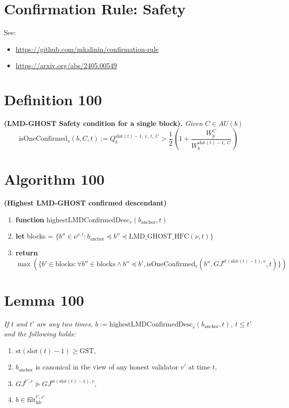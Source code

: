 \documentclass{article}
\begin{document}
\section*{Confirmation Rule: Safety}

See:
\begin{itemize}
    \item \href{https://github.com/mkalinin/confirmation-rule}{https://github.com/mkalinin/confirmation-rule}
    \item \href{https://arxiv.org/abs/2405.00549}{https://arxiv.org/abs/2405.00549}
\end{itemize}

\section*{Definition 100}
\textbf{(LMD-GHOST Safety condition for a single block).} \textit{Given $C \in AU(b)$}
\[
\text{isOneConfirmed}_v(b, C, t) := Q^{\text{slot}(t)-1,\ v,\ t,\ C}_{b} > \frac{1}{2}\left(1 + \frac{W^C_p}{W^{\text{slot}(t)-1,\ C}_b}\right)
\]

\section*{Algorithm 100}
\textbf{(Highest LMD-GHOST confirmed descendant)}

\begin{enumerate}
    \item \textbf{function} highestLMDConfirmedDesc$_v(b_{\text{anchor}}, t)$
    \item \quad \textbf{let} blocks = $\{b'' \in \nu^{v,t} : b_{\text{anchor}} \preceq b'' \preceq \text{LMD\_GHOST\_HFC}(\nu, t)\}$
    \item \quad \textbf{return} $\max(\{b' \in \text{blocks} : \forall b'' \in \text{blocks} \wedge b'' \preceq b', \text{isOneConfirmed}_v(b'', GJ^{\text{st}(\text{slot}(t) - 1),v}, t)\})$
\end{enumerate}

\section*{Lemma 100}
\textit{If $t$ and $t'$ are any two times, $b := \text{highestLMDConfirmedDesc}_v(b_{\text{anchor}}, t)$, $t \leq t'$ and the following holds:}
\begin{enumerate}
    \item $\text{st}(\text{slot}(t) - 1) \geq \text{GST},$
    \item $b_{\text{anchor}}$ is canonical in the view of any honest validator $v'$ at time $t,$
    \item $GJ^{t',v} \succeq GJ^{\text{st}(\text{slot}(t) - 1),v},$
    \item $b \in \text{filt}^{t',v'}_{\text{hfc}}$
\end{enumerate}
\end{document}
